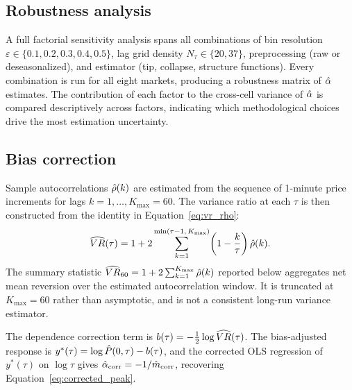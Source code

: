 \documentclass[conference]{IEEEtran}
\begin{document}
\subsection{Robustness analysis}
\label{sec:methodology:robustness}

A full factorial sensitivity analysis spans all combinations of bin resolution
$\varepsilon\in\{0.1,0.2,0.3,0.4,0.5\}$, lag grid density $N_\tau\in\{20,37\}$,
preprocessing (raw or deseasonalized), and estimator (tip, collapse,
structure functions). Every combination is run for all eight markets, producing
a robustness matrix of $\hat{\alpha}$ estimates. The contribution of each factor to
the cross-cell variance of $\hat{\alpha}$ is compared descriptively across factors,
indicating which methodological choices drive the most estimation uncertainty.

\subsection{Bias correction}
\label{sec:methodology:bias}

Sample autocorrelations $\hat{\rho}(k)$ are estimated from the sequence of
1-minute price increments for lags $k = 1,\ldots,K_{\max} = 60$. The
variance ratio at each $\tau$ is then constructed from the identity
in Equation~\eqref{eq:vr_rho}:
\begin{equation}
  \widehat{VR}(\tau)
  = 1 + 2\sum_{k=1}^{\min(\tau-1,\,K_{\max})}\!
    \left(1 - \frac{k}{\tau}\right)\hat{\rho}(k).
  \label{eq:vr_hat}
\end{equation}
The summary statistic $\widehat{VR}_{60} = 1 + 2\sum_{k=1}^{K_{\max}}\hat{\rho}(k)$
reported below aggregates net mean reversion over the estimated
autocorrelation window. It is truncated at $K_{\max}=60$ rather than
asymptotic, and is not a consistent long-run variance estimator.

The dependence correction term is $b(\tau) = -\tfrac{1}{2}\log\widehat{VR}(\tau)$.
The bias-adjusted response is $y^*(\tau) = \log\hat{P}(0,\tau) - b(\tau)$, and
the corrected OLS regression of $y^*(\tau)$ on $\log\tau$ gives
$\hat{\alpha}_{\mathrm{corr}} = -1/\hat{m}_{\mathrm{corr}}$, recovering
Equation~\eqref{eq:corrected_peak}.
\end{document}
